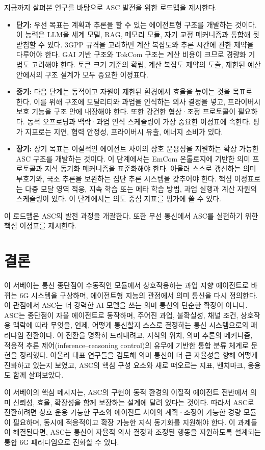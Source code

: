 지금까지 살펴본 연구를 바탕으로 ASC 발전을 위한 로드맵을 제시한다.
\begin{itemize}[leftmargin=1.5em]
\item \textbf{단기:} 우선 목표는 계획과 추론을 할 수 있는 에이전트형 구조를 개발하는 것이다. 이 능력은 LLM을 세계 모델, RAG, 메모리 모듈, 자기 교정 메커니즘과 통합해 뒷받침할 수 있다. 3GPP 규격을 고려하면 계산 복잡도와 추론 시간에 관한 제약을 다루어야 한다. GAI 기반 구조와 TokCom 구조는 계산 비용이 크므로 경량화 기법도 고려해야 한다. 토큰 크기 기준의 확립, 계산 복잡도 제약의 도출, 제한된 예산 안에서의 구조 설계가 모두 중요한 이정표다.
\item \textbf{중기:} 다음 단계는 동적이고 자원이 제한된 환경에서 효율을 높이는 것을 목표로 한다. 이를 위해 구조에 모달리티와 과업을 인식하는 의사 결정을 넣고, 프라이버시 보호 기능을 구조 안에 내장해야 한다. 또한 강건한 협상·조정 프로토콜이 필요하다. 동적 오프로딩과 맥락·과업 인식 스케줄링이 가장 중요한 이정표에 속한다. 평가 지표로는 지연, 협력 안정성, 프라이버시 유출, 에너지 소비가 있다.
\item \textbf{장기:} 장기 목표는 이질적인 에이전트 사이의 상호 운용성을 지원하는 확장 가능한 ASC 구조를 개발하는 것이다. 이 단계에서는 EmCom 온톨로지에 기반한 의미 프로토콜과 지식 동기화 메커니즘을 표준화해야 한다. 아울러 스스로 갱신하는 의미 부호기와, 국소 추론을 보완하는 집단 추론 시스템을 갖추어야 한다. 핵심 이정표로는 다중 모달 영역 적응, 지속 학습 또는 메타 학습 방법, 과업 실행과 계산 자원의 스케줄링이 있다. 이 단계에서는 의도 중심 지표를 평가에 쓸 수 있다.
\end{itemize}
이 로드맵은 ASC의 발전 과정을 개괄한다. 또한 무선 통신에서 ASC를 실현하기 위한 핵심 이정표를 제시한다.

\section{결론}

이 서베이는 통신 종단점이 수동적인 모듈에서 상호작용하는 과업 지향 에이전트로 바뀌는 6G 시스템을 구상하며, 에이전트형 지능의 관점에서 의미 통신을 다시 정의한다. 이 관점에서 ASC는 더 강력한 AI 모델을 쓰는 의미 통신의 단순한 확장이 아니다. ASC는 종단점이 자율 에이전트로 동작하며, 주어진 과업, 불확실성, 채널 조건, 상호작용 맥락에 따라 무엇을, 언제, 어떻게 통신할지 스스로 결정하는 통신 시스템으로의 패러다임 전환이다. 이 전환을 명확히 드러내려고, 지식의 위치, 의미 추론의 메커니즘, 적응적 추론 제어(inference–reasoning control)의 유무에 기반한 통합 분류 체계로 문헌을 정리했다. 아울러 대표 연구들을 검토해 의미 통신이 더 큰 자율성을 향해 어떻게 진화하고 있는지 보였고, ASC의 핵심 구성 요소와 새로 떠오르는 지표, 벤치마크, 응용도 함께 살펴보았다.

이 서베이의 핵심 메시지는, ASC의 구현이 동적 환경의 이질적 에이전트 전반에서 의미 신뢰성, 효율, 확장성을 함께 보장하는 설계에 달려 있다는 것이다. 따라서 ASC로 전환하려면 상호 운용 가능한 구조와 에이전트 사이의 계획·조정이 가능한 경량 모듈이 필요하며, 동시에 적응적이고 확장 가능한 지식 동기화를 지원해야 한다. 이 과제들이 해결된다면, ASC는 통신이 자율적 의사 결정과 조정된 행동을 지원하도록 설계되는 통합 6G 패러다임으로 진화할 수 있다.

